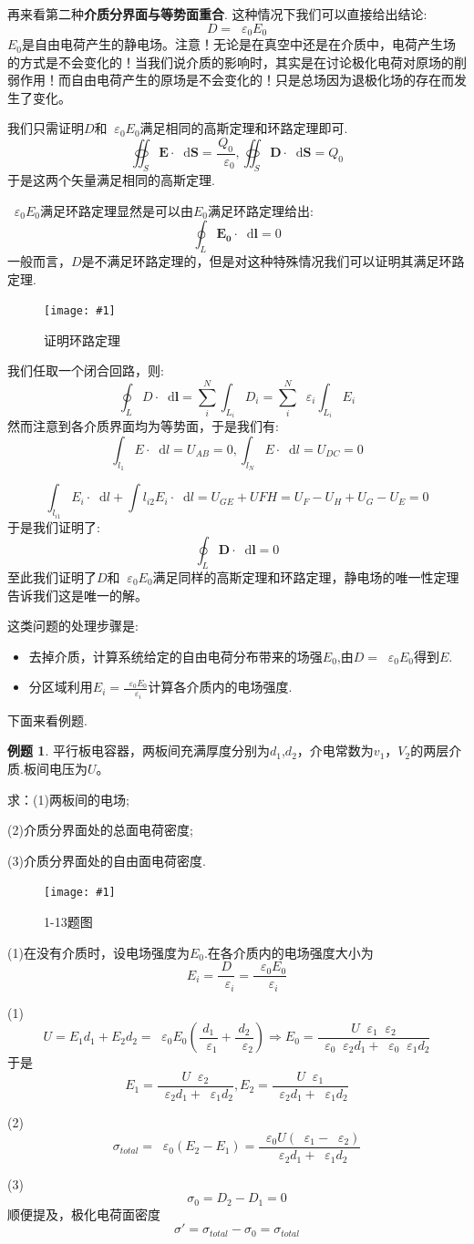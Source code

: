\documentclass[12pt,a4paper,oneside]{report}
\theoremstyle{definition}
\newtheorem{example}{例题}[chapter]
\theoremstyle{remark}
\newcommand{\insertfig}[3]{
    \begin{figure}[ht]
        \centering
        \texttt{[image: \#1]}
        \caption{#2}
        \label{fig:#1}
    \end{figure}
}
\renewcommand{\d}{\mathop{}\!\mathrm{d}}
\renewcommand{\v}{\mathop{}\!\varepsilon}
\begin{document}
再来看第二种\textbf{介质分界面与等势面重合}. 这种情况下我们可以直接给出结论:
\[
D = \v_0 E_0
\]
$E_0$是自由电荷产生的静电场。注意！无论是在真空中还是在介质中，电荷产生场的方式是不会变化的！当我们说介质的影响时，其实是在讨论极化电荷对原场的削弱作用！而自由电荷产生的原场是不会变化的！只是总场因为退极化场的存在而发生了变化。

我们只需证明$D$和$\v_0 E_0$满足相同的高斯定理和环路定理即可.
\[
\oiint_S \mathbf{E} \cdot \d \mathbf{S}  = \frac{Q_0}{\v_0},
\oiint_S \mathbf{D} \cdot \d \mathbf{S}  = Q_0
\]
于是这两个矢量满足相同的高斯定理.

$\v_0 E_0$满足环路定理显然是可以由$E_0$满足环路定理给出:
\[
\oint_L \mathbf{E_0} \cdot \d \mathbf{l}  = 0 
\]
一般而言，$D$是不满足环路定理的，但是对这种特殊情况我们可以证明其满足环路定理.
  \insertfig{1-4.png}{证明环路定理}{0.25}

我们任取一个闭合回路，则:
\[
\oint_L D \cdot \d \mathbf{l} = \sum_i^N \int_{L_i} D_i = \sum_i^N \v_i \int_{L_i} E_i
\]
然而注意到各介质界面均为等势面，于是我们有:
\[
\int_{l_1} E \cdot \d l =U_{AB} =0, \int_{l_N} E \cdot \d l =U_{DC} =0 
\]

\[
\int_{l_{i1}} E_i \cdot \d l+\int{l_{i2}} E_i \cdot \d l = U_{GE}+U{FH}=U_F - U_H+U_G-U_E = 0
\]
于是我们证明了:
\[
\oint_L \mathbf{D} \cdot \d \mathbf{l}  = 0
\]
至此我们证明了$D$和$\v_0 E_0$满足同样的高斯定理和环路定理，静电场的唯一性定理告诉我们这是唯一的解。

这类问题的处理步骤是:
\begin{itemize}
  \item 去掉介质，计算系统给定的自由电荷分布带来的场强$E_0$,由$D=\v_0 E_0$得到$E$.
  \item 分区域利用$E_i=\frac{\v_0 E_0}{\v_i}$计算各介质内的电场强度.
\end{itemize}

下面来看例题.
\begin{example}
  平行板电容器，两板间充满厚度分别为$d_1$,$d_2$，介电常数为$v_1$，$V_2$的两层介质.板间电压为$U$。
  
  求：(1)两板间的电场;
  
  (2)介质分界面处的总面电荷密度;
  
  (3)介质分界面处的自由面电荷密度.
  \insertfig{1-5.png}{1-13题图}{0.25}

(1)在没有介质时，设电场强度为$E_0$.在各介质内的电场强度大小为
\[
E_i = \frac{D}{\v_i}=\frac{\v_0 E_0}{\v_i}
\]

(1)\[U=E_1d_1+E_2d_2=\v_0E_0(\frac{d_1}{\v_1}+\frac{d_2}{\v_2})
\Rightarrow E_0 = \frac{U\v_1\v_2}{\v_0\v_2d_1+\v_0\v_1d_2}
\]
于是
\[
E_1=\frac{U\v_2}{\v_2d_1+\v_1d_2},E_2 = \frac{U\v_1}{\v_2d_1+\v_1d_2}
\]

(2)\[
\sigma_{total} = \v_0(E_2-E_1) =\frac{\v_0U(\v_1-\v_2)}{\v_2d_1+\v_1d_2}  
\]

(3)\[
\sigma_0 = D_2-D_1 = 0
\]
顺便提及，极化电荷面密度\[
\sigma' = \sigma_{total} -\sigma_0 = \sigma_{total}
\]
\end{example}
\newpage
\end{document}
